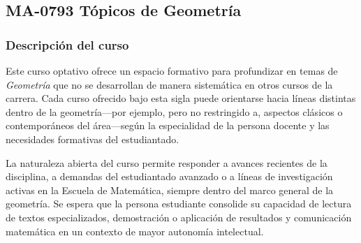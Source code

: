 \newpage
\subsection*{MA-0793 Tópicos de Geometría}

\hypertarget{MA0793}{}
\begin{refsection}
\begin{table}[H]
\end{table}

\subsubsection*{Descripción del curso}

Este curso optativo ofrece un espacio formativo para profundizar en temas de \emph{Geometría} que no se desarrollan de manera sistemática en otros cursos de la carrera. Cada curso ofrecido bajo esta sigla puede orientarse hacia líneas distintas dentro de la geometría---por ejemplo, pero no restringido a, aspectos clásicos o contemporáneos del área---según la especialidad de la persona docente y las necesidades formativas del estudiantado.

La naturaleza abierta del curso permite responder a avances recientes de la disciplina, a demandas del estudiantado avanzado o a líneas de investigación activas en la Escuela de Matemática, siempre dentro del marco general de la geometría. Se espera que la persona estudiante consolide su capacidad de lectura de textos especializados, demostración o aplicación de resultados y comunicación matemática en un contexto de mayor autonomía intelectual.


\end{refsection}
